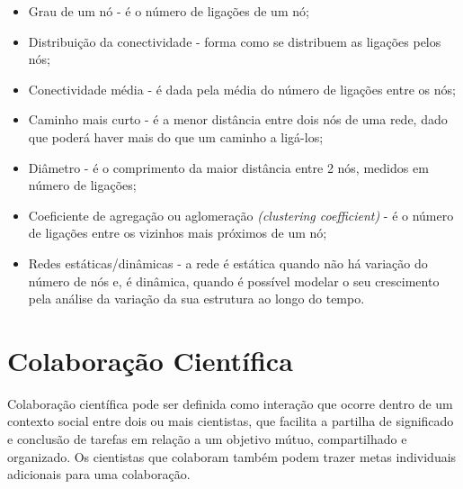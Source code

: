 \documentclass[12pt]{article}
\begin{document}


\begin{itemize}
\item Grau de um nó - é o número de ligações de um nó;
\item Distribuição da conectividade - forma como se distribuem as ligações pelos nós;
\item Conectividade média - é dada pela média do número de ligações entre os nós;
\item Caminho mais curto - é a menor distância entre dois nós de uma rede, dado que poderá haver mais do que um caminho a ligá-los;
\item Diâmetro - é o comprimento da maior distância entre 2 nós, medidos em número de ligações;
\item Coeficiente de agregação ou aglomeração \textit{(clustering coefficient)} - é o número de ligações entre os vizinhos mais próximos de um nó;
\item Redes estáticas/dinâmicas - a rede é estática quando não há variação do número de nós e, é dinâmica, quando é possível modelar o seu crescimento pela análise da variação da sua estrutura ao longo do tempo.
\end{itemize}

\section{Colaboração Científica}

Colaboração científica pode ser definida como interação que ocorre dentro de um contexto social entre dois ou mais cientistas, que facilita a partilha de significado e conclusão de tarefas em relação a um objetivo mútuo, compartilhado e organizado. Os cientistas que colaboram também podem trazer metas individuais adicionais para uma colaboração. \cite{Sonnenwald}
\end{document}
